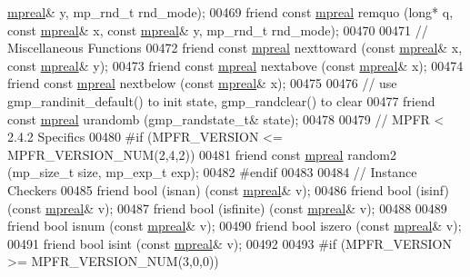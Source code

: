 \begin{DoxyCode}
      \hyperlink{classmpfr_1_1mpreal}{mpreal}& y, mp\_rnd\_t rnd\_mode);
00469     \textcolor{keyword}{friend} \textcolor{keyword}{const} \hyperlink{classmpfr_1_1mpreal}{mpreal} remquo      (\textcolor{keywordtype}{long}* q, \textcolor{keyword}{const} \hyperlink{classmpfr_1_1mpreal}{mpreal}& x, \textcolor{keyword}{const} 
      \hyperlink{classmpfr_1_1mpreal}{mpreal}& y, mp\_rnd\_t rnd\_mode);
00470 
00471     \textcolor{comment}{// Miscellaneous Functions}
00472     \textcolor{keyword}{friend} \textcolor{keyword}{const} \hyperlink{classmpfr_1_1mpreal}{mpreal} nexttoward (\textcolor{keyword}{const} \hyperlink{classmpfr_1_1mpreal}{mpreal}& x, \textcolor{keyword}{const} \hyperlink{classmpfr_1_1mpreal}{mpreal}& y);
00473     \textcolor{keyword}{friend} \textcolor{keyword}{const} \hyperlink{classmpfr_1_1mpreal}{mpreal} nextabove  (\textcolor{keyword}{const} \hyperlink{classmpfr_1_1mpreal}{mpreal}& x);
00474     \textcolor{keyword}{friend} \textcolor{keyword}{const} \hyperlink{classmpfr_1_1mpreal}{mpreal} nextbelow  (\textcolor{keyword}{const} \hyperlink{classmpfr_1_1mpreal}{mpreal}& x);
00475 
00476     \textcolor{comment}{// use gmp\_randinit\_default() to init state, gmp\_randclear() to clear}
00477     \textcolor{keyword}{friend} \textcolor{keyword}{const} \hyperlink{classmpfr_1_1mpreal}{mpreal} urandomb (gmp\_randstate\_t& state);
00478 
00479 \textcolor{comment}{// MPFR < 2.4.2 Specifics}
00480 \textcolor{preprocessor}{#if (MPFR\_VERSION <= MPFR\_VERSION\_NUM(2,4,2))}
00481     \textcolor{keyword}{friend} \textcolor{keyword}{const} \hyperlink{classmpfr_1_1mpreal}{mpreal} random2 (mp\_size\_t size, mp\_exp\_t exp);
00482 \textcolor{preprocessor}{#endif}
00483 
00484     \textcolor{comment}{// Instance Checkers}
00485     \textcolor{keyword}{friend} bool (isnan)    (\textcolor{keyword}{const} \hyperlink{classmpfr_1_1mpreal}{mpreal}& v);
00486     \textcolor{keyword}{friend} bool (isinf)    (\textcolor{keyword}{const} \hyperlink{classmpfr_1_1mpreal}{mpreal}& v);
00487     \textcolor{keyword}{friend} bool (isfinite) (\textcolor{keyword}{const} \hyperlink{classmpfr_1_1mpreal}{mpreal}& v);
00488 
00489     \textcolor{keyword}{friend} \textcolor{keywordtype}{bool} isnum    (\textcolor{keyword}{const} \hyperlink{classmpfr_1_1mpreal}{mpreal}& v);
00490     \textcolor{keyword}{friend} \textcolor{keywordtype}{bool} iszero   (\textcolor{keyword}{const} \hyperlink{classmpfr_1_1mpreal}{mpreal}& v);
00491     \textcolor{keyword}{friend} \textcolor{keywordtype}{bool} isint    (\textcolor{keyword}{const} \hyperlink{classmpfr_1_1mpreal}{mpreal}& v);
00492 
00493 \textcolor{preprocessor}{#if (MPFR\_VERSION >= MPFR\_VERSION\_NUM(3,0,0))}

\end{DoxyCode}
